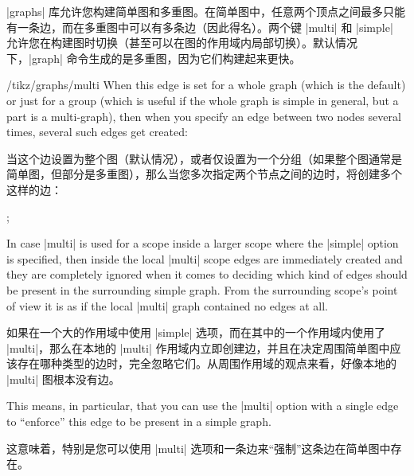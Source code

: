 |graphs| 库允许您构建简单图和多重图。在简单图中，任意两个顶点之间最多只能有一条边，而在多重图中可以有多条边（因此得名）。两个键 |multi| 和 |simple| 允许您在构建图时切换（甚至可以在图的作用域内局部切换）。默认情况下，|graph| 命令生成的是多重图，因为它们构建起来更快。

\begin{key}{/tikz/graphs/multi}
    When this edge is set for a whole graph (which is the default) or just for
    a group (which is useful if the whole graph is simple in general, but a
    part is a multi-graph), then when you specify an edge between two nodes
    several times, several such edges get created:
    
    当这个边设置为整个图（默认情况），或者仅设置为一个分组（如果整个图通常是简单图，但部分是多重图），那么当您多次指定两个节点之间的边时，将创建多个这样的边：
\begin{codeexample}[preamble={\usetikzlibrary{graphs}}]
\tikz {};
\end{codeexample}
    In case |multi| is used for a scope inside a larger scope where the
    |simple| option is specified, then inside the local |multi| scope edges are
    immediately created and they are completely ignored when it comes to
    deciding which kind of edges should be present in the surrounding simple
    graph. From the surrounding scope's point of view it is as if the local
    |multi| graph contained no edges at all.

    如果在一个大的作用域中使用 |simple| 选项，而在其中的一个作用域内使用了 |multi|，那么在本地的 |multi| 作用域内立即创建边，并且在决定周围简单图中应该存在哪种类型的边时，完全忽略它们。从周围作用域的观点来看，好像本地的 |multi| 图根本没有边。

This means, in particular, that you can use the |multi| option with a
    single edge to ``enforce'' this edge to be present in a simple graph.

    这意味着，特别是您可以使用 |multi| 选项和一条边来“强制”这条边在简单图中存在。
\end{key}

